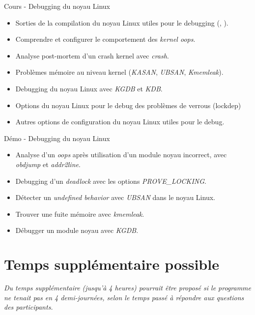 \documentclass[a4paper,12pt,obeyspaces,spaces,hyphens]{article}
\begin{document}
\feagendatwocolumn
{Cours - Debugging du noyau Linux}
{
  \begin{itemize}
  \item Sorties de la compilation du noyau Linux utiles pour le
    debugging (, ).
  \item Comprendre et configurer le comportement des {\em kernel oops}.
  \item Analyse post-mortem d'un crash kernel avec {\em crash}.
  \item Problèmes mémoire au niveau kernel ({\em KASAN}, {\em UBSAN}, {\em Kmemleak}).
  \item Debugging du noyau Linux avec {\em KGDB} et {\em KDB}.
  \item Options du noyau Linux pour le debug des problèmes de verrous
    (lockdep)
  \item Autres options de configuration du noyau Linux utiles pour le
    debug.
  \end{itemize}
}
{Démo - Debugging du noyau Linux}
{
  \begin{itemize}
  \item Analyse d'un {\em oops} après utilisation d'un module noyau
    incorrect, avec {\em obdjump} et {\em addr2line}.
  \item Debugging d'un {\em deadlock} avec les options {\em PROVE\_LOCKING}.
  \item Détecter un {\em undefined behavior} avec {\em UBSAN} dans le noyau Linux.
  \item Trouver une fuite mémoire avec {\em kmemleak}.
  \item Débugger un module noyau avec {\em KGDB}.
  \end{itemize}
}

\section{Temps supplémentaire possible}

{\em Du temps supplémentaire (jusqu'à 4 heures) pourrait être proposé si le programme ne tenait
     pas en 4 demi-journées, selon le temps passé à répondre aux questions des participants.}
\end{document}
